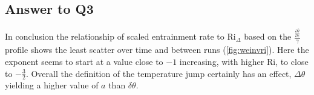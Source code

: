 \clearpage

\subsection{Answer to Q3}
In conclusion the relationship of scaled entrainment rate to \acs{Ri}$_{\Delta}$ based on the $\frac{\frac{\partial \overline{\theta}}{\partial z}}{\gamma}$ profile shows the least scatter over time and between runs (\ref{fig:weinvri}).  Here the exponent seems to start at a value close to $-1$ increasing, with higher \acs{Ri}, to close to $-\frac{3}{2}$.  Overall the definition of the temperature jump certainly has an effect, $\Delta \theta$ yielding a higher value of $a$ than $\delta \theta$.

\endinput

Any text after an \endinput is ignored.
You could put scraps here or things in progress.
